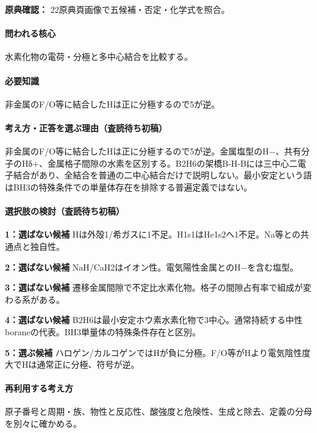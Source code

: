 \noindent\textbf{原典確認：} 22原典頁画像で五候補・否定・化学式を照合。\par

\paragraph{問われる核心} 水素化物の電荷・分極と多中心結合を比較する。

\paragraph{必要知識} 非金属のF/O等に結合したHは正に分極するので5が逆。

\paragraph{考え方・正答を選ぶ理由（査読待ち初稿）} 非金属のF/O等に結合したHは正に分極するので5が逆。金属塩型のH−、共有分子のHδ+、金属格子間隙の水素を区別する。B2H6の架橋B-H-Bには三中心二電子結合があり、全結合を普通の二中心結合だけで説明しない。最小安定という語はBH3の特殊条件での単量体存在を排除する普遍定義ではない。

\paragraph{選択肢の検討（査読待ち初稿）}\mbox{}\par

\noindent\textbf{1：選ばない候補} Hは外殻1/希ガスに1不足。H1s1はHe1s2へ1不足。Na等との共通点と独自性。\par

\noindent\textbf{2：選ばない候補} NaH/CaH2はイオン性。電気陽性金属とのH−を含む塩型。\par

\noindent\textbf{3：選ばない候補} 遷移金属間隙で不定比水素化物。格子の間隙占有率で組成が変わる系がある。\par

\noindent\textbf{4：選ばない候補} B2H6は最小安定ホウ素水素化物で3中心。通常持続する中性boraneの代表。BH3単量体の特殊条件存在と区別。\par

\noindent\textbf{5：選ぶ候補} ハロゲン/カルコゲンではHが負に分極。F/O等がHより電気陰性度大でHは通常正に分極、符号が逆。\par

\paragraph{再利用する考え方} 原子番号と周期・族、物性と反応性、酸強度と危険性、生成と除去、定義の分母を別々に確かめる。

